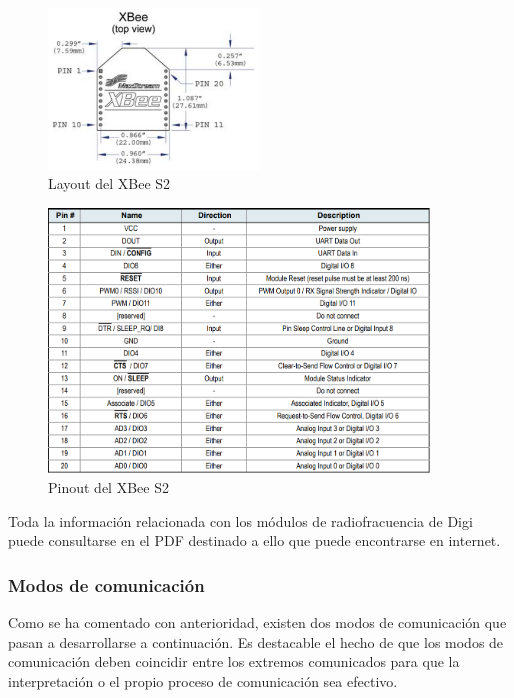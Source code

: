 \begin{figure}[tb]
\centering
\includegraphics[width=0.5\textwidth]{figuras/XBeeLayout.png}
\caption{Layout del XBee S2}
\label{fig:XBLayout}
\end{figure}

\begin{figure}[bt]
\centering
\includegraphics[width=0.9\textwidth]{figuras/XBeePinout.png}
\caption{Pinout del XBee S2}
\label{fig:XBPinout}
\end{figure}

Toda la información relacionada con los módulos de radiofracuencia de Digi puede consultarse en el PDF destinado a ello\cite{Digi:2018} que puede encontrarse en internet.

\subsubsection{Modos de comunicación}\label{subsubsec:modoscom}

Como se ha comentado con anterioridad, existen dos modos de comunicación que pasan a desarrollarse a continuación. Es destacable el hecho de que los modos de comunicación deben coincidir entre los extremos comunicados para que la interpretación o el propio proceso de comunicación sea efectivo.

